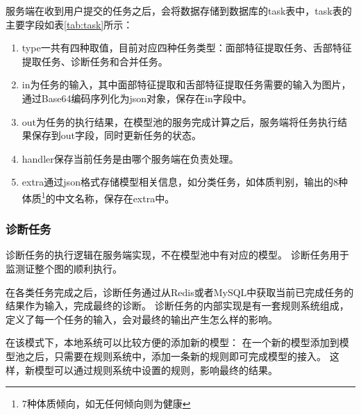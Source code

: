 服务端在收到用户提交的任务之后，会将数据存储到数据库的task表中，task表的主要字段如表\ref{tab:task}所示：
\begin{enumerate}
    
    \item type一共有四种取值，目前对应四种任务类型：面部特征提取任务、舌部特征提取任务、诊断任务和合并任务。

    \item in为任务的输入，其中面部特征提取和舌部特征提取任务需要的输入为图片，通过Base64编码序列化为json对象，保存在in字段中。

    \item out为任务的执行结果，在模型池的服务完成计算之后，服务端将任务执行结果保存到out字段，同时更新任务的状态。

    \item  handler保存当前任务是由哪个服务端在负责处理。

    \item extra通过json格式存储模型相关信息，如分类任务，如体质判别，输出的8种体质\footnote{7种体质倾向，如无任何倾向则为健康}的中文名称，保存在extra中。
\end{enumerate}

\subsubsection{诊断任务}


诊断任务的执行逻辑在服务端实现，不在模型池中有对应的模型。 诊断任务用于监测证整个图的顺利执行。

在各类任务完成之后，诊断任务通过从Redis或者MySQL中获取当前已完成任务的结果作为输入，完成最终的诊断。 
诊断任务的内部实现是有一套规则系统组成，定义了每一个任务的输入，会对最终的输出产生怎么样的影响。

在该模式下，本地系统可以比较方便的添加新的模型： 在一个新的模型添加到模型池之后，只需要在规则系统中，添加一条新的规则即可完成模型的接入。
这样，新模型可以通过规则系统中设置的规则，影响最终的结果。

